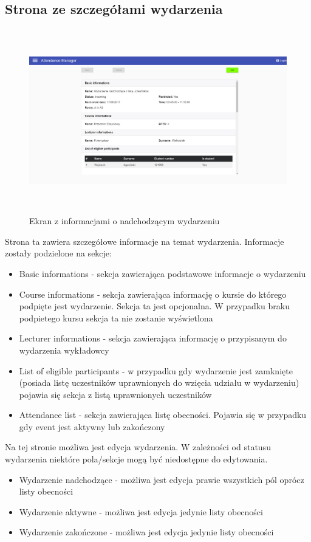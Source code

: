 \subsection{Strona ze szczegółami wydarzenia}
\begin{figure}[h!]
\centering
\includegraphics[height=8cm,width=15cm]{images/EventIncomingDetails}
\caption{Ekran z informacjami o nadchodzącym wydarzeniu}
\label{fig:EventIncomingDetails}
\end{figure}
Strona ta zawiera szczegółowe informacje na temat wydarzenia. Informacje zostały podzielone na sekcje:
\begin{itemize}
    \item Basic informations - sekcja zawierająca podstawowe informacje o wydarzeniu
    \item Course informations - sekcja zawierająca informację o kursie do którego podpięte jest wydarzenie. Sekcja ta jest opcjonalna. W przypadku braku podpietego kursu sekcja ta nie zostanie wyświetlona
    \item Lecturer informations - sekcja zawierająca informację o przypisanym do wydarzenia wykładowcy
    \item List of eligible participants - w przypadku gdy wydarzenie jest zamknięte (posiada listę uczestników uprawnionych do wzięcia udziału w wydarzeniu) pojawia się sekcja z listą uprawnionych uczestników
    \item Attendance list - sekcja zawierająca listę obecności. Pojawia się w przypadku gdy event jest aktywny lub zakończony
\end{itemize}
Na tej stronie możliwa jest edycja wydarzenia. W zależności od statusu wydarzenia niektóre pola/sekcje mogą być niedostępne do edytowania.
\begin{itemize}
    \item Wydarzenie nadchodzące - możliwa jest edycja prawie wszystkich pól oprócz listy obecności
    \item Wydarzenie aktywne - możliwa jest edycja jedynie listy obecności
    \item Wydarzenie zakończone - możliwa jest edycja jedynie listy obecności
\end{itemize}

